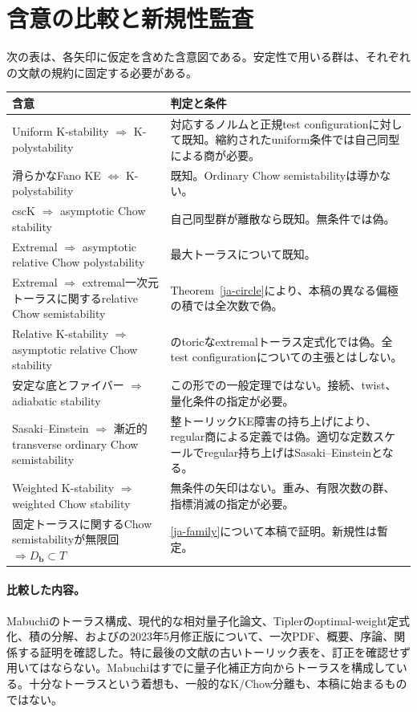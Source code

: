 \documentclass[12pt]{amsart}
\theoremstyle{definition}
\theoremstyle{remark}
\numberwithin{equation}{section}
\begin{document}
\section{含意の比較と新規性監査}\label{ja-audit}

次の表は、各矢印に仮定を含めた含意図である。安定性で用いる群は、それぞれの文献の規約に固定する必要がある。
\begingroup\small
\begin{longtable}{p{}p{}}
\hline
含意 & 判定と条件\\ \hline
Uniform K-stability $\Rightarrow$ K-polystability &
対応するノルムと正規test configurationに対して既知。縮約されたuniform条件では自己同型による商が必要。\\
滑らかなFano KE $\Leftrightarrow$ K-polystability &
既知\cite{ja-CDS}。Ordinary Chow semistabilityは導かない。\\
cscK $\Rightarrow$ asymptotic Chow stability &
自己同型群が離散なら既知\cite{ja-Don01}。無条件では偽\cite{ja-OSY}。\\
Extremal $\Rightarrow$ asymptotic relative Chow polystability &
最大トーラスについて既知\cite{ja-Mab16,ja-Sey,ja-ST}。\\
Extremal $\Rightarrow$ extremal一次元トーラスに関するrelative Chow semistability &
Theorem~\ref{ja-circle}により、本稿の異なる偏極の積では全次数で偽。\\
Relative K-stability $\Rightarrow$ asymptotic relative Chow stability &
\cite{ja-YZ}のtoricなextremalトーラス定式化では偽。全test configurationについての主張とはしない。\\
安定な底とファイバー $\Rightarrow$ adiabatic stability &
この形での一般定理ではない。接続、twist、量化条件の指定が必要\cite{ja-DS19,ja-DS20,ja-Hat}。\\
Sasaki--Einstein $\Rightarrow$ 漸近的transverse ordinary Chow semistability &
整トーリックKE障害\cite{ja-OSY}の持ち上げにより、regular商による定義では偽。適切な定数スケールでregular持ち上げはSasaki--Einsteinとなる。\\
Weighted K-stability $\Rightarrow$ weighted Chow stability &
無条件の矢印はない。重み、有限次数の群、指標消滅の指定が必要。\\
固定トーラスに関するChow semistabilityが無限回 $\Rightarrow D_{\boldsymbol b}\subset T$ &
\eqref{ja-family}について本稿で証明。新規性は暫定。\\ \hline
\end{longtable}
\endgroup

\paragraph{比較した内容。}
Mabuchiのトーラス構成\cite{ja-Mab04}、現代的な相対量子化論文\cite{ja-Mab16,ja-Sey,ja-ST,ja-Has17}、Tiplerのoptimal-weight定式化\cite{ja-Tip}、積の分解\cite{ja-AH}、および\cite{ja-YZ}の2023年5月修正版について、一次PDF、概要、序論、関係する証明を確認した。特に最後の文献の古いトーリック表を、訂正を確認せず用いてはならない。Mabuchiはすでに量子化補正方向からトーラスを構成している。十分なトーラスという着想も、一般的なK/Chow分離も、本稿に始まるものではない。
\end{document}
